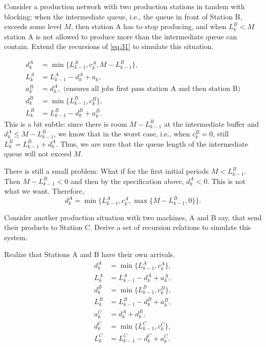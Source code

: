 \begin{exercise}
  Consider a production network with two production stations in tandem
  with blocking: when the intermediate queue, i.e., the queue in front of
  Station B, exceeds some level $M$, then station A has to stop
  producing, and when $L^B_k < M$ station A is not allowed to produce
  more than the intermediate queue can contain. Extend the recursions
  of \eqref{eq:31} to simulate this situation.
\begin{solution}
\begin{equation}
  \begin{split}
    d^A_k &= \min\{L_{k-1}^A, c_k^A, M-L^B_{k-1}\}, \\
    L_k^A &= L_{k-1}^A -d_k^A + a_k, \\
    a_k^B &= d_{k}^A, \text{ (ensures all jobs first pass station A and then station B)}\\
    d^B_k &= \min\{L_{k-1}^B, c_k^B\}, \\
    L_k^B &= L_{k-1}^B -d_k^B + a_k^B.
  \end{split}
\end{equation}
This is a bit subtle: since there is room $M-L^B_{k-1}$ at the
intermediate buffer and $d_k^A \leq M-L^B_{k-1}$, we know that in the
worst case, i.e., when $c_k^B=0$, still $L^B_k = L_{k-1}^B +
d_k^A$.
Thus, we are sure that the queue length of the intermediate queue will
not exceed $M$.

There is still  a small problem: What if for the first initial periods  $M<L^B_{k-1}$. Then $M-L^B_{k-1}<0$ and then by the specification above, $d_k^A < 0$. This is not what we want. Therefore, 
\begin{equation*}
  d^A_k = \min\{L_{k-1}^A, c_k^A, \max\{M-L^B_{k-1}, 0\}\}.
\end{equation*}
\end{solution}
\end{exercise}

\begin{exercise}
  Consider another production situation with two machines, A and B
  say, that send their products to Station C. Derive a set of
  recursion relations to simulate this system. 
\begin{solution}
Realize that Stations A and B have their own arrivals. 
\begin{equation}
  \begin{split}
    d^A_k &= \min\{L_{k-1}^A, c_k^A\}, \\
    L_k^A &= L_{k-1}^A -d_k^A + a_k^A, \\
    d^B_k &= \min\{L_{k-1}^B, c_k^B\}, \\
    L_k^B &= L_{k-1}^B -d_k^B + a_k^B, \\
    a_k^C &= d_{k}^A+d_{k}^B,\\
    d^C_k &= \min\{L_{k-1}^C, c_k^C\}, \\
    L_k^C &= L_{k-1}^C -d_k^C + a_k^C.
  \end{split}
\end{equation}
\end{solution}
\end{exercise}


